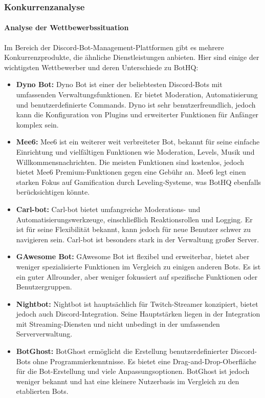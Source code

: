 \subsubsection{Konkurrenzanalyse}\label{konkurrenzanalyse}

\paragraph{Analyse der Wettbewerbssituation}
Im Bereich der Discord-Bot-Management-Plattformen gibt es mehrere Konkurrenzprodukte, die ähnliche Dienstleistungen anbieten. Hier sind einige der wichtigsten Wettbewerber und deren Unterschiede zu BotHQ:

\begin{itemize}
  \item \textbf{Dyno Bot:}
  Dyno Bot ist einer der beliebtesten Discord-Bots mit umfassenden Verwaltungsfunktionen. Er bietet Moderation, Automatisierung und benutzerdefinierte Commands. Dyno ist sehr benutzerfreundlich, jedoch kann die Konfiguration von Plugins und erweiterter Funktionen für Anfänger komplex sein.

  \item \textbf{Mee6:}
  Mee6 ist ein weiterer weit verbreiteter Bot, bekannt für seine einfache Einrichtung und vielfältigen Funktionen wie Moderation, Levels, Musik und Willkommensnachrichten. Die meisten Funktionen sind kostenlos, jedoch bietet Mee6 Premium-Funktionen gegen eine Gebühr an. Mee6 legt einen starken Fokus auf Gamification durch Leveling-Systeme, was BotHQ ebenfalls berücksichtigen könnte.

  \item \textbf{Carl-bot:}
  Carl-bot bietet umfangreiche Moderations- und Automatisierungswerkzeuge, einschließlich Reaktionsrollen und Logging. Er ist für seine Flexibilität bekannt, kann jedoch für neue Benutzer schwer zu navigieren sein. Carl-bot ist besonders stark in der Verwaltung großer Server.

  \item \textbf{GAwesome Bot:}
  GAwesome Bot ist flexibel und erweiterbar, bietet aber weniger spezialisierte Funktionen im Vergleich zu einigen anderen Bots. Es ist ein guter Allrounder, aber weniger fokussiert auf spezifische Funktionen oder Benutzergruppen.

  \item \textbf{Nightbot:}
  Nightbot ist hauptsächlich für Twitch-Streamer konzipiert, bietet jedoch auch Discord-Integration. Seine Hauptstärken liegen in der Integration mit Streaming-Diensten und nicht unbedingt in der umfassenden Serververwaltung.

  \item \textbf{BotGhost:}
  BotGhost ermöglicht die Erstellung benutzerdefinierter Discord-Bots ohne Programmierkenntnisse. Es bietet eine Drag-and-Drop-Oberfläche für die Bot-Erstellung und viele Anpassungsoptionen. BotGhost ist jedoch weniger bekannt und hat eine kleinere Nutzerbasis im Vergleich zu den etablierten Bots.
\end{itemize}

